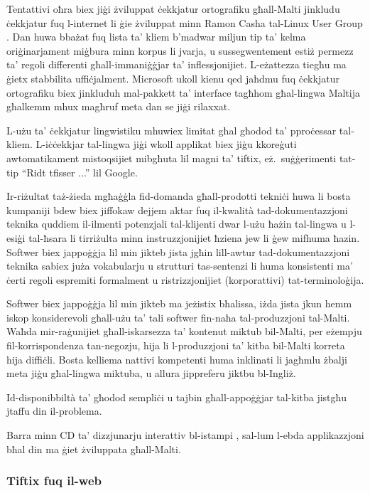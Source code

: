 \begin{multicols}{2}
Tentattivi oħra biex jiġi żviluppat ċekkjatur ortografiku għall-Malti jinkludu ċekkjatur fuq l-internet li ġie żviluppat minn Ramon Casha tal-Linux User Group \cite{Linux-spellcheck1}. Dan huwa bbażat fuq lista ta’ kliem b’madwar miljun tip ta’ kelma oriġinarjament miġbura minn korpus li jvarja, u sussegwentement estiż permezz ta’ regoli differenti għall-immaniġġjar ta’ inflessjonijiet. L-eżattezza tiegħu ma ġietx stabbilita uffiċjalment. Microsoft ukoll kienu qed jaħdmu fuq ċekkjatur ortografiku biex jinkluduh mal-pakkett ta’ interface tagħhom għal-lingwa Maltija għalkemm mhux magħruf meta dan se jiġi rilaxxat.

L-użu ta’ ċekkjatur lingwistiku mhuwiex limitat għal għodod ta’  pproċessar tal-kliem. L-iċċekkjar tal-lingwa jiġi wkoll applikat biex jiġu kkoreġuti awtomatikament mistoqsijiet mibgħuta lil magni ta’ tiftix, eż.~suġġerimenti tat-tip ``Ridt tfisser ...'' lil Google. 

Ir-riżultat taż-żieda mgħaġġla fid-domanda għall-prodotti tekniċi huwa li bosta kumpaniji bdew biex jiffokaw dejjem aktar fuq il-kwalità tad-dokumentazzjoni teknika quddiem il-ilmenti potenzjali tal-klijenti dwar l-użu ħażin tal-lingwa u l-esiġi tal-ħsara li tirriżulta minn instruzzjonijiet ħziena jew li ġew mifhuma ħazin. Softwer biex jappoġġja lil min jikteb jista jgħin lill-awtur tad-dokumentazzjoni teknika sabiex juża vokabularju u strutturi tas-sentenzi li huma konsistenti ma' ċerti regoli espremiti formalment u ristrizzjonijiet (korporattivi) tat-terminoloġija.

Softwer biex jappoġġja lil min jikteb ma jeżistix bħalissa, iżda jista jkun hemm iskop konsiderevoli għall-użu ta' tali softwer fin-naħa tal-produzzjoni tal-Malti. Waħda mir-raġunijiet għall-iskarsezza ta' kontenut miktub bil-Malti, per eżempju fil-korrispondenza tan-negozju, hija li l-produzzjoni ta' kitba bil-Malti korreta hija diffiċli. Bosta kelliema nattivi kompetenti huma inklinati li jagħmlu żbalji meta jiġu għal-lingwa miktuba, u allura jippreferu jiktbu bl-Ingliż.

Id-disponibbiltà ta' għodod sempliċi u tajbin għall-appoġġjar tal-kitba jistgħu jtaffu din il-problema.

Barra minn CD ta’ dizzjunarju interattiv bl-istampi \cite{Sciriha:1997}, sal-lum l-ebda applikazzjoni bħal din ma ġiet żviluppata għall-Malti.

\subsubsection{Tiftix fuq il-web}


\end{multicols}
